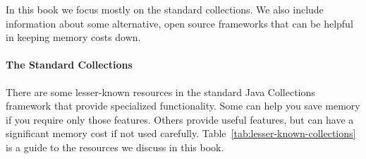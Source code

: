 
In this book we focus
mostly on the standard collections. We also include information 
about some alternative, open source frameworks that can be helpful in keeping
memory costs down.


\paragraph{The Standard Collections} There are some
lesser-known resources in the standard Java Collections framework that provide specialized functionality. Some can help you
save memory if you require only those features.  Others provide useful
features, but can have a significant memory cost if not used carefully.
Table~\ref{tab:lesser-known-collections} is a guide to the resources we discuss
in this book.

